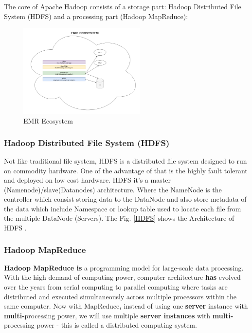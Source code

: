 \documentclass[journal]{IEEEtran}
\begin{document}
	The core of Apache Hadoop consists of a storage part: Hadoop Distributed File System (HDFS) and a processing part (Hadoop MapReduce):
	
	\begin{figure}
		\centering
		\includegraphics[width=2.5in]{EMR_Ecosystem.png}
		\caption{EMR Ecosystem}
		\label{EMR}
	\end{figure}
	
	\subsubsection{Hadoop Distributed File System (HDFS)}
	
	Not like traditional file system, HDFS is a distributed file system designed to run on commodity hardware. One of the advantage of that is the highly fault tolerant and deployed on low cost hardware. HDFS it's a master (Namenode)/slave(Datanodes) architecture. Where the NameNode is the controller which consist storing data to the DataNode and also store metadata of the data which include Namespace or lookup table used to locate each file from the multiple DataNode (Servers). The Fig. \ref{HDFS} shows the Architecture of HDFS \cite{HDFS}.
	
	\subsubsection{Hadoop MapReduce}
	
	\textbf{Hadoop MapReduce is} a programming model for large-scale data processing. With the high demand of computing power, computer architecture \textbf{has} evolved over the years from serial computing to parallel computing where tasks are distributed and executed simultaneously across multiple processors within the same computer. Now with MapReduce\textbf{,} instead of using one \textbf{server} instance with \textbf{multi-}processing power, we will use multiple \textbf{server instances} with \textbf{multi-}processing power - this is called a distributed computing system.
	
\end{document}
